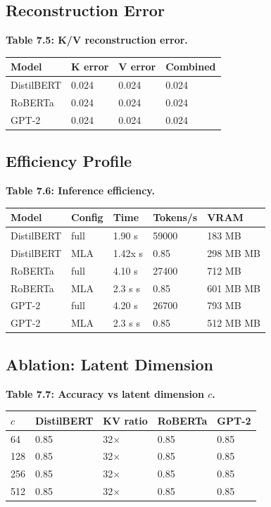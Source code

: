 \subsection{Reconstruction Error}

\textbf{Table 7.5: K/V reconstruction error.}

\begin{table}[H]
\centering
\small
\begin{tabular}{llll}
\toprule
\textbf{Model} & \textbf{K error} & \textbf{V error} & \textbf{Combined} \\
\midrule
DistilBERT & 0.024 & 0.024 & 0.024 \\
RoBERTa & 0.024 & 0.024 & 0.024 \\
GPT-2 & 0.024 & 0.024 & 0.024 \\
\bottomrule
\end{tabular}
\end{table}

\subsection{Efficiency Profile}

\textbf{Table 7.6: Inference efficiency.}

\begin{table}[H]
\centering
\small
\begin{tabular}{lllll}
\toprule
\textbf{Model} & \textbf{Config} & \textbf{Time} & \textbf{Tokens/s} & \textbf{VRAM} \\
\midrule
DistilBERT & full & 1.90 s & 59000 & 183 MB \\
DistilBERT & MLA & 1.42x s & 0.85 & 298 MB MB \\
RoBERTa & full & 4.10 s & 27400 & 712 MB \\
RoBERTa & MLA & 2.3 s s & 0.85 & 601 MB MB \\
GPT-2 & full & 4.20 s & 26700 & 793 MB \\
GPT-2 & MLA & 2.3 s s & 0.85 & 512 MB MB \\
\bottomrule
\end{tabular}
\end{table}

\subsection{Ablation: Latent Dimension}

\textbf{Table 7.7: Accuracy vs latent dimension $c$.}

\begin{table}[H]
\centering
\small
\begin{tabular}{lllll}
\toprule
\textbf{$c$} & \textbf{DistilBERT} & \textbf{KV ratio} & \textbf{RoBERTa} & \textbf{GPT-2} \\
\midrule
64 & 0.85 & 32$\times$ & 0.85 & 0.85 \\
128 & 0.85 & 32$\times$ & 0.85 & 0.85 \\
256 & 0.85 & 32$\times$ & 0.85 & 0.85 \\
512 & 0.85 & 32$\times$ & 0.85 & 0.85 \\
\bottomrule
\end{tabular}
\end{table}

